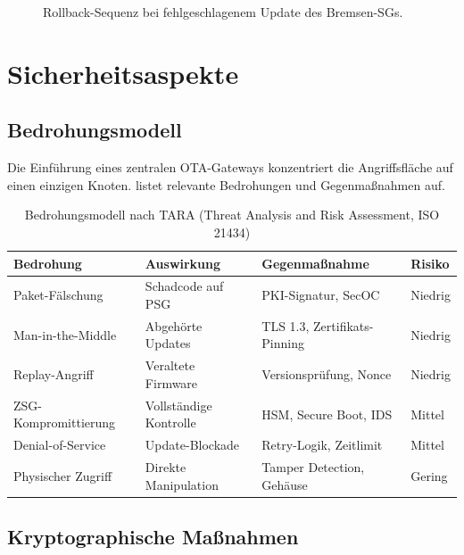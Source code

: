 ﻿\documentclass[12pt,a4paper,twoside]{article}
\begin{document}
\begin{figure}[h!]
  \centering
  
  \caption{Rollback-Sequenz bei fehlgeschlagenem Update des Bremsen-SGs.}
  \label{fig:rollback}
\end{figure}


\section{Sicherheitsaspekte}
\label{sec:sicherheit}


\subsection{Bedrohungsmodell}

Die Einführung eines zentralen OTA-Gateways konzentriert die Angriffsfläche
auf einen einzigen Knoten.  listet relevante Bedrohungen
und Gegenmaßnahmen auf.

\begin{table}[htbp]
  \centering
  \caption{Bedrohungsmodell nach TARA (Threat Analysis and Risk Assessment,
    ISO 21434)}
  \label{tab:threats}
  \begin{tabularx}{\textwidth}{lXXl}
    \toprule
    \textbf{Bedrohung} & \textbf{Auswirkung} & \textbf{Gegenmaßnahme} &
    \textbf{Risiko} \\
    \midrule
    Paket-Fälschung & Schadcode auf PSG & PKI-Signatur, SecOC & Niedrig \\
    Man-in-the-Middle & Abgehörte Updates & TLS 1.3, Zertifikats-Pinning
      & Niedrig \\
    Replay-Angriff & Veraltete Firmware & Versionsprüfung, Nonce & Niedrig \\
    ZSG-Kompromittierung & Vollständige Kontrolle & HSM, Secure Boot, IDS
      & Mittel \\
    Denial-of-Service & Update-Blockade & Retry-Logik, Zeitlimit & Mittel \\
    Physischer Zugriff & Direkte Manipulation & Tamper Detection, Gehäuse
      & Gering \\
    \bottomrule
  \end{tabularx}
\end{table}

\subsection{Kryptographische Maßnahmen}
\end{document}
